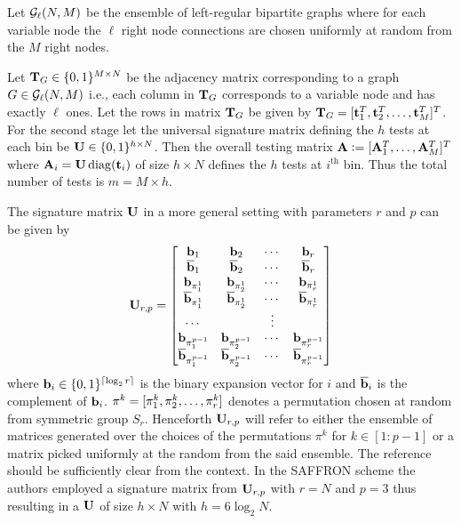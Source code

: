 \begin{definition}
Let $\mathcal{G}_{\ell}(N,M)$ be the ensemble of left-regular bipartite graphs where for each variable node the $\ell$ right node connections are chosen uniformly at random from the $M$ right nodes.
\end{definition}

Let $\mathbf{T}_{G}\in\{0,1\}^{M\times N }$ be the adjacency matrix corresponding to a graph $G\in\mathcal{G}_{\ell}(N,M)$ i.e., each column in $\mathbf{T}_{G}$ corresponds to a variable node and has exactly $\ell$ ones. Let the rows in matrix $\mathbf{T}_{G}$ be given by $\mathbf{T}_{G}=[\mathbf{t}^{T}_1,\mathbf{t}^{T}_{2},\dots, \mathbf{t}^{T}_{M}]^{T}$. For the second stage let the universal signature matrix defining the $h$ tests at each bin be $\mathbf{U}\in\{0,1\}^{h\times N}$. Then the overall testing matrix $\mathbf{A}\mathrel{\mathop:}= [\mathbf{A}_{1}^{T},\ldots,\mathbf{A}_{M}^{T}]^T$ where $\mathbf{A}_{i}=\mathbf{U} \operatorname{diag} (\mathbf{t}_i)$ of size $h\times N$ defines the $h$ tests at $i^{\text{th}}$ bin. Thus the total number of tests is $m=M\times h$. 
 
 The signature matrix 	$\mathbf{U}$ in a more general setting with parameters $r$ and $p$ can be given by
 \begin{align}
\label{Eqn:SignatureMatrix}
\mathbf{U}_{r,p}=\begin{bmatrix}
\mathbf{b}_1  & \mathbf{b}_2 &\cdots & \mathbf{b}_r \\
\overline{\mathbf{b}}_1 & \overline{\mathbf{b}}_2 & \cdots & \overline{\mathbf{b}}_r\\
\mathbf{b}_{\pi^{1}_{1}} & \mathbf{b}_{\pi^{1}_{2}} & \cdots & \mathbf{b}_{\pi^{1}_{r}}\\
\overline{\mathbf{b}}_{\pi^{1}_{1}} & \overline{\mathbf{b}}_{\pi^{1}_{2}} & \cdots & \overline{\mathbf{b}}_{\pi^{1}_{r}}\\
\cdots &  &\vdots \\
\mathbf{b}_{\pi^{p-1}_{1}} & \mathbf{b}_{\pi^{p-1}_{2}} & \cdots & \mathbf{b}_{\pi^{p-1}_{r}}\\
\overline{\mathbf{b}}_{\pi^{p-1}_{1}} & \overline{\mathbf{b}}_{\pi^{p-1}_{2}} & \cdots & \overline{\mathbf{b}}_{\pi^{p-1}_{r}}
\end{bmatrix}
\end{align}  
where $\mathbf{b}_{i}\in\{0,1\}^{\lceil{\log_{2}r}\rceil}$ is the binary expansion vector for $i$ and $\overline{\mathbf{b}}_{i}$ is the complement of $\mathbf{b}_{i}$. $\mathbf{\pi}^{k}=[\pi^{k}_1,\pi^{k}_2,\ldots,\pi^{k}_r]$ denotes a permutation chosen at random from symmetric group $S_{r}$. Henceforth $\mathbf{U}_{r,p}$ will refer to either the ensemble of matrices generated over the choices of the permutations $\pi^{k}$ for $k\in[1:p-1]$ or a matrix picked uniformly at the random from the said ensemble. The reference should be sufficiently clear from the context. In the SAFFRON scheme the authors employed a signature matrix from $\mathbf{U}_{r,p}$ with $r=N$ and $p=3$ thus resulting in a $\mathbf{U}$ of size $h \times N$ with $h=6\log_{2}N$. 

